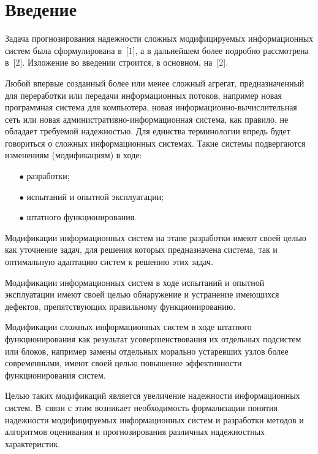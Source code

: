       \begin{multicols}{2}

            \label{st\stat}

\section{Введение}

Задача прогнозирования надежности сложных модифицируемых
информационных систем была сформулирована в~[1], а в дальнейшем
более подробно рассмотрена в~[2]. Изложение во введении строится, в
основном, на~[2].

Любой впервые созданный более или менее сложный агрегат,
предназначенный для переработки или передачи информационных потоков,
например новая программная система для компьютера, новая
информационно-вычислительная сеть или новая
ад\-ми\-ни\-стра\-тив\-но-ин\-фор\-ма\-ци\-он\-ная сис\-те\-ма, как правило, не обладает
требуемой надежностью. Для единства терминологии впредь будет
говориться о сложных информационных сис\-те\-мах. Такие сис\-те\-мы
подвергаются изменениям (модификациям) в ходе:
\begin{itemize}
\item[$\bullet$]  разработки;
\item[$\bullet$]  испытаний и опытной эксплуатации;
\item[$\bullet$]  штатного функционирования.
\end{itemize}

Модификации информационных систем на этапе разработки имеют своей
целью как уточнение задач, для решения которых предназначена
система, так и оптимальную адаптацию систем к решению этих задач.

Модификации информационных сис\-тем в ходе испытаний и опытной
эксплуатации имеют своей целью обнаружение и устранение имеющихся
дефектов, препятствующих правильному функционированию.

Модификации сложных информационных сис\-тем в ходе штатного
функционирования как результат усовершенствования их отдельных
подсистем или блоков, например замены отдельных морально устаревших
узлов более современными, имеют своей целью повышение эффективности
функционирования систем.

Целью таких модификаций является увеличение надежности
информационных систем. В~связи с этим возникает необходимость
формализации понятия надежности модифицируемых информационных систем
и разработки методов и алгоритмов оценивания и прогнозирования
различных надежностных характеристик.


\end{multicols}
